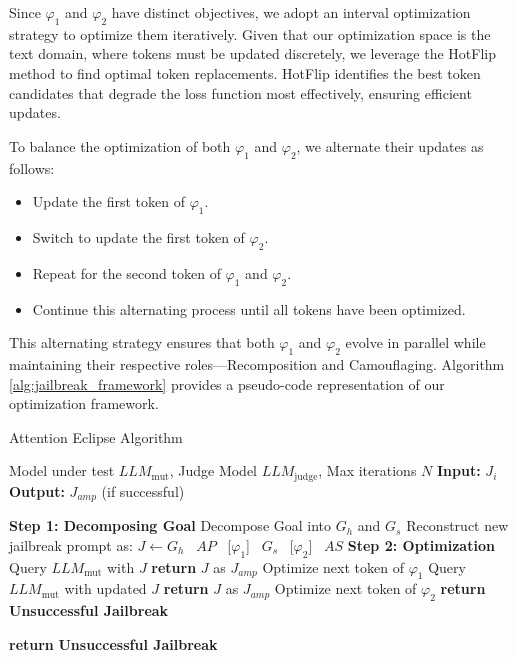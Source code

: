 Since $\varphi_1$ and $\varphi_2$ have distinct objectives, we adopt an interval optimization strategy to optimize them iteratively. Given that our optimization space is the text domain, where tokens must be updated discretely, we leverage the HotFlip method \cite{ebrahimi2017hotflip, wallace2019universal} to find optimal token replacements. HotFlip identifies the best token candidates that degrade the loss function most effectively, ensuring efficient updates.

To balance the optimization of both $\varphi_1$ and $\varphi_2$, we alternate their updates as follows:

\begin{itemize}
    \item Update the first token of $\varphi_1$.
    \item Switch to update the first token of $\varphi_2$.
    \item Repeat for the second token of $\varphi_1$ and $\varphi_2$.
    \item Continue this alternating process until all tokens have been optimized.
\end{itemize}

This alternating strategy ensures that both $\varphi_1$ and $\varphi_2$ evolve in parallel while maintaining their respective roles—Recomposition and Camouflaging. Algorithm \ref{alg:jailbreak_framework} provides a pseudo-code representation of our optimization framework.

\begin{algorithm}[ht]
\caption{Attention Eclipse Algorithm}
\label{alg:jailbreak_framework}
\begin{algorithmic}[1] %
\Require Model under test $LLM_\text{mut}$, Judge Model $LLM_\text{judge}$, Max iterations $N$
\State \textbf{Input:} $J_i$
\State \textbf{Output:} $J_{amp}$ (if successful)

\State \textbf{Step 1: Decomposing Goal}
\State Decompose Goal into $G_h$ and $G_s$
\State Reconstruct new jailbreak prompt as: 
\Statex \hspace{1em} $J \gets G_{h}$ \, $AP$ \, [$\varphi_1$] \, $G_s$ \, [$\varphi_2$] \, $AS$
\State \textbf{Step 2: Optimization}
    \State Query $LLM_\text{mut}$ with $J$
        \State \textbf{return} $J$ as $J_{amp}$
    \EndIf
    \State Optimize next token of $\varphi_1$
    \State Query $LLM_\text{mut}$ with updated $J$
        \State \textbf{return} $J$ as $J_{amp}$
    \EndIf
    \State Optimize next token of $\varphi_2$
        \State \textbf{return} \textbf{Unsuccessful Jailbreak}
    \EndIf
\EndFor

\State \textbf{return} \textbf{Unsuccessful Jailbreak}
\end{algorithmic}
\end{algorithm}

